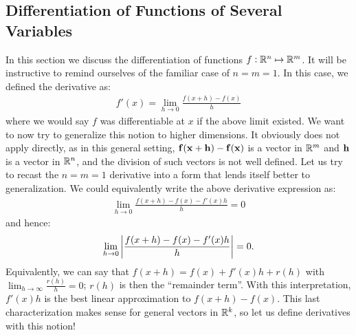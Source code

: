 \subsection{Differentiation of Functions of Several Variables}
\noindent In this section we discuss the differentiation of functions $f: \mathbb{R}^n \mapsto \mathbb{R}^m$. It will be instructive to remind ourselves of the familiar case of $n = m = 1$. In this case, we defined the derivative as:
\begin{align*}
    f'(x) = \lim_{h \rightarrow 0}\frac{f(x + h) - f(x)}{h}
\end{align*}
where we would say $f$ was differentiable at $x$ if the above limit existed. We want to now try to generalize this notion to higher dimensions. It obviously does not apply directly, as in this general setting, $\mathbf{f}(\mathbf{x} + \mathbf{h}) - \mathbf{f}(\mathbf{x})$ is a vector in $\mathbb{R}^m$ and $\mathbf{h}$ is a vector in $\mathbb{R}^n$, and the division of such vectors is not well defined. Let us try to recast the $n = m = 1$ derivative into a form that lends itself better to generalization. We could equivalently write the above derivative expression as:
\begin{align*}
    \lim_{h \rightarrow 0}\frac{f(x + h) - f(x) - f'(x)h}{h} = 0
\end{align*}
and hence:
\begin{align*}
    \lim_{h \rightarrow 0}\abs{\frac{f(x + h) - f(x) - f'(x)h}{h}} = 0.
\end{align*}
Equivalently, we can say that $f(x + h) = f(x) + f'(x)h + r(h)$ with $\lim_{h \rightarrow \infty}\frac{r(h)}{h} = 0$; $r(h)$ is then the ``remainder term''. With this interpretation, $f'(x)h$ is the best linear approximation to $f(x + h) - f(x)$. This last characterization makes sense for general vectors in $\mathbb{R}^k$, so let us define derivatives with this notion!

\setcounter{rudin}{10}

